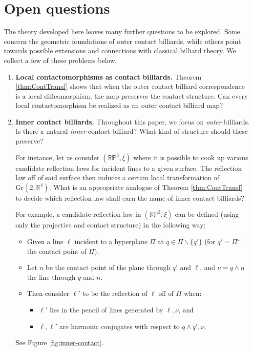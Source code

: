 \documentclass{article}
\begin{document}

\section{Open questions}
\label{sec:questions}

The theory developed here leaves many further questions to be explored. Some concern the 
geometric foundations of outer contact billiards, while others point towards possible 
extensions and connections with classical billiard theory. We collect a few of these 
problems below.

\begin{enumerate}
    \item \textbf{Local contactomorphisms as contact billiards.} Theorem 
    \ref{thm:ContTransf} shows that when the outer contact billiard correspondence is a 
    local diffeomorphism, the map preserves the contact structure. Can every local 
    contactomorphism be realized as an outer contact billiard map?
    
    \item \textbf{Inner contact billiards.} Throughout this paper, we focus on \emph{outer} 
    billiards. Is there a natural \emph{inner} contact billiard? What kind of structure 
    should these preserve? 

    For instance, let us consider $(\mathbb{RP}^3, \xi)$ where it is possible to cook up 
    various candidate reflection laws for incident lines to a given surface. The reflection 
    law off of said surface then induces a certain local transformation of $\text{Gr}(2,\mathbb{R}^4)$. What is an appropriate analogue of Theorem \ref{thm:ContTransf} to 
    decide which reflection law shall earn the name of inner contact billiards?

    For example, a candidate reflection law in $(\mathbb{RP}^3, \xi)$ can be defined 
    (using only the projective and contact structure) in the following way:
    \begin{itemize}
        \item Given a line $\ell$ incident to a hyperplane $\Pi$ at $q\in \Pi \backslash \{ q'\}$ (for $q' = \Pi^\omega$ the contact point of $\Pi$).
        \item Let $n$ be the contact point of the plane through $q'$ and $\ell$, and 
        $\nu = q\wedge n$ the line through $q$ and $n$.
        \item Then consider $\ell'$ to be the reflection of $\ell$ off of $\Pi$ when: 
            \begin{itemize}
                \item[(a)] $\ell'$ lies in the pencil of lines generated by $\ell, \nu$, and 
                \item[(b)] $\ell, \ell'$ are harmonic conjugates with respect to $q\wedge q', \nu$. 
            \end{itemize}
    \end{itemize}
    See Figure \ref{fig:inner-contact}.


\end{enumerate}
\end{document}
